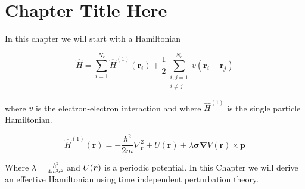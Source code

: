 \chapter{Chapter Title Here} %

In this chapter we will start with a Hamiltonian

\begin{equation}
\label{Ham1}
\hat{H} = \sum_{i=1}^{N_e} \hat{H}^{(1)}(\textbf{r}_i) + \frac{1}{2} \sum_{\substack{i,j = 1 \\ i \neq j}} ^ {N_e} v(\textbf{r}_i - \textbf{r}_j)
\end{equation}

where $v$ is the electron-electron interaction and where $\hat{H}^{(1)}$ is the single particle Hamiltonian.

\begin{equation}
\hat{H}^{(1)}(\textbf{r}) = -\frac{\hbar^2}{2m}\nabla^2_{\textbf{r}} + U(\textbf{r}) + \lambda\boldsymbol{\sigma}\boldsymbol{\nabla}V(\textbf{r}) \times \textbf{p}
\end{equation}

Where $\lambda = \frac{\hbar^2}{4m^2c^2}$ and $U(\boldsymbol{r})$ is a periodic potential. In this Chapter we will derive an effective Hamiltonian using time independent perturbation theory.


